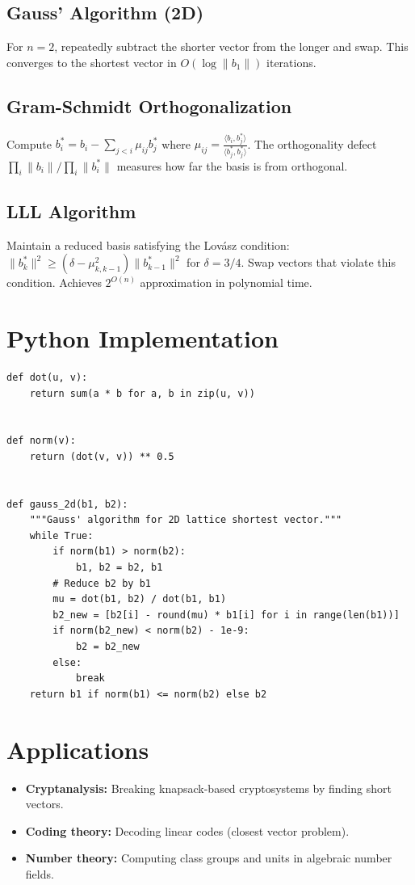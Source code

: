 \subsection{Gauss' Algorithm (2D)}
For $n = 2$, repeatedly subtract the shorter vector from the longer and swap. This converges to the shortest vector in $O(\log \|b_1\|)$ iterations.

\subsection{Gram-Schmidt Orthogonalization}
Compute $b_i^* = b_i - \sum_{j < i} \mu_{ij} b_j^*$ where $\mu_{ij} = \frac{\langle b_i, b_j^* \rangle}{\langle b_j^*, b_j^* \rangle}$. The orthogonality defect $\prod_i \|b_i\| / \prod_i \|b_i^*\|$ measures how far the basis is from orthogonal.

\subsection{LLL Algorithm}
Maintain a reduced basis satisfying the Lov\'{a}sz condition: $\|b_k^*\|^2 \ge (\delta - \mu_{k,k-1}^2) \|b_{k-1}^*\|^2$ for $\delta = 3/4$. Swap vectors that violate this condition. Achieves $2^{O(n)}$ approximation in polynomial time.

\section{Python Implementation}

\begin{lstlisting}[style=python, caption=Gauss' 2D Shortest Vector]
def dot(u, v):
    return sum(a * b for a, b in zip(u, v))


def norm(v):
    return (dot(v, v)) ** 0.5


def gauss_2d(b1, b2):
    """Gauss' algorithm for 2D lattice shortest vector."""
    while True:
        if norm(b1) > norm(b2):
            b1, b2 = b2, b1
        # Reduce b2 by b1
        mu = dot(b1, b2) / dot(b1, b1)
        b2_new = [b2[i] - round(mu) * b1[i] for i in range(len(b1))]
        if norm(b2_new) < norm(b2) - 1e-9:
            b2 = b2_new
        else:
            break
    return b1 if norm(b1) <= norm(b2) else b2
\end{lstlisting}

\section{Applications}
\begin{itemize}
    \item \textbf{Cryptanalysis:} Breaking knapsack-based cryptosystems by finding short vectors.
    \item \textbf{Coding theory:} Decoding linear codes (closest vector problem).
    \item \textbf{Number theory:} Computing class groups and units in algebraic number fields.
\end{itemize}


